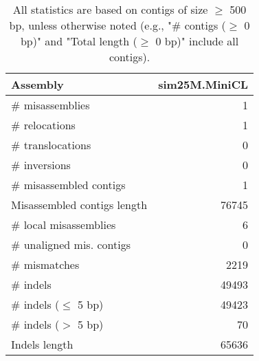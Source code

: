 \documentclass[12pt,a4paper]{article}
\begin{document}
\begin{table}[ht]
\begin{center}
\caption{All statistics are based on contigs of size $\geq$ 500 bp, unless otherwise noted (e.g., "\# contigs ($\geq$ 0 bp)" and "Total length ($\geq$ 0 bp)" include all contigs).}
\begin{tabular}{|l*{1}{|r}|}
\hline
Assembly & sim25M.MiniCL \\ \hline
\# misassemblies & 1 \\ \hline
\hspace{5mm}\# relocations & 1 \\ \hline
\hspace{5mm}\# translocations & 0 \\ \hline
\hspace{5mm}\# inversions & 0 \\ \hline
\# misassembled contigs & 1 \\ \hline
Misassembled contigs length & 76745 \\ \hline
\# local misassemblies & 6 \\ \hline
\# unaligned mis. contigs & 0 \\ \hline
\# mismatches & 2219 \\ \hline
\# indels & 49493 \\ \hline
\hspace{5mm}\# indels ($\leq$ 5 bp) & 49423 \\ \hline
\hspace{5mm}\# indels ($>$ 5 bp) & 70 \\ \hline
Indels length & 65636 \\ \hline
\end{tabular}
\end{center}
\end{table}
\end{document}
